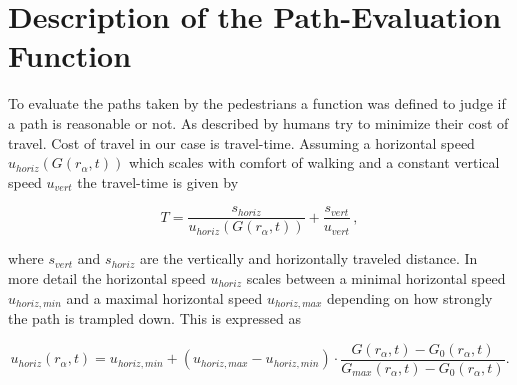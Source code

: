 \section{Description of the Path-Evaluation Function}

To evaluate the paths taken by the pedestrians a function was defined to judge if a path is reasonable or not. As described by \citet{koelbl_helbing:2003} humans try to minimize their cost of travel. Cost of travel in our case is travel-time. Assuming a horizontal speed $u_{horiz}(G(r_{\alpha},t))$ which scales with comfort of walking and a constant vertical speed $u_{vert}$ the travel-time is given by

\begin{equation}
T= \frac{s_{horiz}}{u_{horiz}(G(r_{\alpha},t))} + \frac{s_{vert}}{u_{vert}} \,,
\end{equation}

where $s_{vert}$ and $s_{horiz}$ are the vertically and horizontally traveled distance. In more detail the horizontal speed $u_{horiz}$ scales between a minimal horizontal speed $u_{horiz,min}$ and a maximal horizontal speed $u_{horiz,max}$ depending on how strongly the path is trampled down. This is expressed as

\begin{equation}
u_{horiz}(r_{\alpha},t) = u_{horiz,min} + (u_{horiz,max}-u_{horiz,min}) \cdot \frac{G(r_{\alpha},t)-G_{0}(r_{\alpha},t)}{G_{max}(r_{\alpha},t)-G_{0}(r_{\alpha},t)}.
\end{equation}